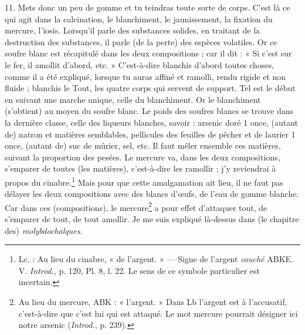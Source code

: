 \documentclass[landscape, a4paper, 11pt, oneside, polutonikogreek, french]{article}
\begin{document}
11. Mets donc un peu de gomme et tu teindras toute sorte de corps. C'est là ce qui agit dans la calcination, le blanchiment, le jaunissement, la fixation du mercure, l'iosis. Lorsqu'il parle des substances solides, en traitant de la destruction des substances, il parle (de la perte) des espèces volatiles. Or ce soufre blanc est récapitulé dans les deux compositions ; car il dit : « Si c'est sur le fer, il amollit d'abord, etc. » C'est-à-dire blanchis d'abord toutes choses, comme il a été expliqué, lorsque tu auras affiné et ramolli, rendu rigide et non fluide ; blanchis le Tout, les quatre corps qui servent de support. Tel est le début en suivant une marche unique, celle du blanchiment. Or le blanchiment (s'obtient) au moyen du soufre blanc. Le poids des soufres blancs se trouve dans la dernière classe, celle des liqueurs blanches, savoir : arsenic doré 1 once, (autant de) natron et matières semblables, pellicules des feuilles de pêcher et de laurier 1 once, (autant de) suc de mûrier, sel, etc. Il faut mêler ensemble ces matières, suivant la proportion des pesées. Le mercure va, dans les deux compositions, s'emparer de toutes (les matières), c'est-à-dire les ramollir ; j'y reviendrai à propos du cinabre.\footnote{Lc. : Au lieu du cinabre, « de l'argent. » --- Signe de l'argent \emph{couché} ABKE. V. \emph{Introd.}, p. 120, Pl. 8, l. 22. Le sens de ce symbole particulier est incertain.} Mais pour que cette amalgamation ait lieu, il ne faut pas délayer les deux compositions avec des blancs d'œufs, de l'eau de gomme blanche. Car dans ces (compositions), le mercure\footnote{Au lieu du mercure, ABK : « l'argent. » Dans Lb l'argent est à l'accusatif, c'est-à-dire que c'est lui qui est attaqué. Le mot mercure pourrait désigner ici notre arsenic (\emph{Introd.}, p. 239).} a pour effet d'attaquer tout, de s'emparer de tout, de tout amollir. Je me suis expliqué là-dessus dans (le chapitre des) \emph{molybdochalques}.
\end{document}
